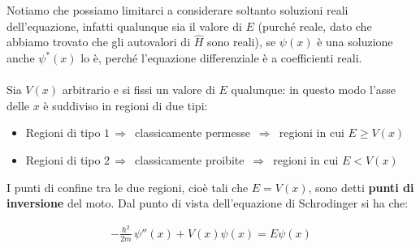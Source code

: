 	Notiamo che possiamo limitarci a considerare soltanto soluzioni reali dell'equazione, infatti qualunque sia il valore di $E$ (purché reale, dato che abbiamo trovato che gli autovalori di $\hat{H}$ sono reali), se $\psi(x)$ è una soluzione anche $\psi^*(x)$ lo è, perché l'equazione differenziale è a coefficienti reali.
	\\
	\\
	Sia $V(x)$ arbitrario e si fissi un valore di $E$ qualunque: in questo modo l'asse delle $x$ è suddiviso in regioni di due tipi:
	
\begin{itemize}
	\item Regioni di tipo $1 \, \Rightarrow \, $ classicamente permesse $\, \Rightarrow \, $ regioni in cui $E \geq V(x)$
	\item Regioni di tipo $2 \, \Rightarrow \, $ classicamente proibite $\, \Rightarrow \, $ regioni in cui $E < V(x)$
\end{itemize}

\vspace{1em}
\begin{center}
\end{center}
\vspace{1em}

	I punti di confine tra le due regioni, cioè tali che $E = V(x)$, sono detti \textbf{punti di inversione} del moto. Dal punto di vista dell'equazione di Schrodinger si ha che:
	
\begin{align*}
	- \frac{\hbar^2}{2m} \, \psi''(x) + V(x) \psi(x) = E \psi(x) 
\end{align*}

